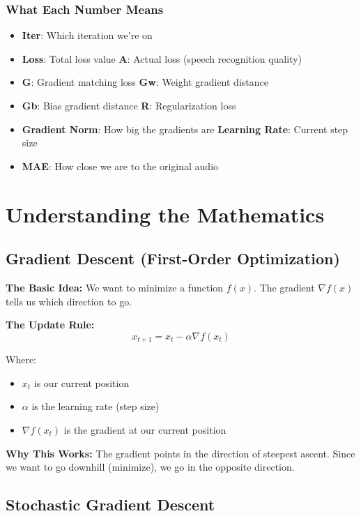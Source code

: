 \documentclass[12pt]{article}
\begin{document}
\subsubsection{What Each Number Means}
\begin{itemize}
    \item \textbf{Iter}: Which iteration we're on
    \item \textbf{Loss}: Total loss value
    \textbf{A}: Actual loss (speech recognition quality)
    \item \textbf{G}: Gradient matching loss
    \textbf{Gw}: Weight gradient distance
    \item \textbf{Gb}: Bias gradient distance
    \textbf{R}: Regularization loss
    \item \textbf{Gradient Norm}: How big the gradients are
    \textbf{Learning Rate}: Current step size
    \item \textbf{MAE}: How close we are to the original audio
\end{itemize}

\section{Understanding the Mathematics}

\subsection{Gradient Descent (First-Order Optimization)}

\textbf{The Basic Idea:}
We want to minimize a function $f(x)$. The gradient $\nabla f(x)$ tells us which direction to go.

\textbf{The Update Rule:}
$$x_{t+1} = x_t - \alpha \nabla f(x_t)$$

Where:
\begin{itemize}
    \item $x_t$ is our current position
    \item $\alpha$ is the learning rate (step size)
    \item $\nabla f(x_t)$ is the gradient at our current position
\end{itemize}

\textbf{Why This Works:}
The gradient points in the direction of steepest ascent. Since we want to go downhill (minimize), we go in the opposite direction.

\subsection{Stochastic Gradient Descent}
\end{document}
